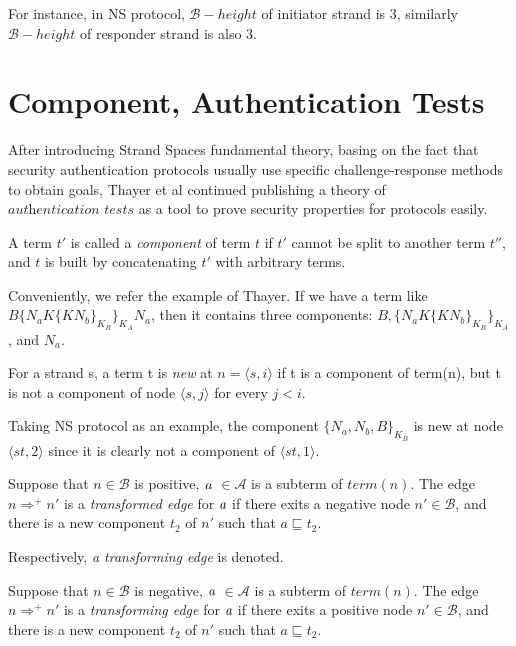 For instance, in NS protocol, $\mathcal{B}-height$ of initiator strand is 3, similarly $\mathcal{B}-height$ of responder strand is also 3.

\section{Component, Authentication Tests}

After introducing Strand Spaces fundamental theory, basing on the fact that security authentication protocols usually use specific challenge-response methods to obtain goals, Thayer et al\cite{authenticationtests} continued publishing a theory of $\textit{authentication tests}$ as a tool to prove security properties for protocols easily. 

\begin{Definition}
 A term $t'$ is called a \emph{component} of term $t$ if $t'$ cannot be split to another term $t''$, and $t$ is built by concatenating $t'$ with arbitrary terms.
\end{Definition}

Conveniently, we refer the example of Thayer\cite{Thayer:2010aa}. If we have a term like $B\{N_aK\{KN_b\}_{K_B}\}_{K_A}N_a$, then it contains three components: $B, \{N_aK\{KN_b\}_{K_B}\}_{K_A}$, and $N_a$. 
 
\begin{Definition}
 For a strand s, a term t is \emph{new} at $n = \langle s,i\rangle$ if t is a component of term(n), but t is not a component of node $\langle s,j\rangle$ for every $j<i$. 
\end{Definition}

Taking NS protocol as an example, the component $\{N_a,N_b,B\}_{K_B}$ is new at node $\langle st,2 \rangle$ since it is clearly not a component of $\langle st,1 \rangle$. 

\begin{Definition} Suppose that $n \in \mathcal{B}$ is positive, $\emph{a}$ $\in \mathcal{A}$ is a subterm of $term(n)$. The edge $n \Rightarrow^+ n'$ is a \emph{transformed edge} for $\emph{a}$ if there exits a negative node $n' \in \mathcal{B}$, and there is a new component $t_2$ of $n'$ such that $a \sqsubseteq t_2$.
\end{Definition}

Respectively, \textit{a transforming edge} is denoted.

\begin{Definition} Suppose that $n \in \mathcal{B}$ is negative, $\emph{a}$ $\in \mathcal{A}$ is a subterm of $term(n)$. The edge $n \Rightarrow^+ n'$ is a \emph{transforming edge} for $\emph{a}$ if there exits a positive node $n' \in \mathcal{B}$, and there is a new component $t_2$ of $n'$ such that $a \sqsubseteq t_2$.
\end{Definition}

